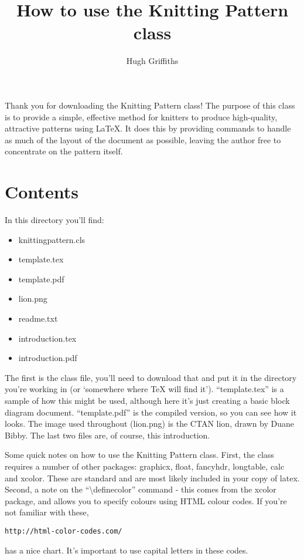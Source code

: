 \documentclass{article}
\title{How to use the Knitting Pattern class}
\author{Hugh Griffiths}
\begin{document}
\maketitle

\pagestyle{fancy}
\fancyhead{}
\fancyfoot{}
\renewcommand{\footrulewidth}{.4pt}
\renewcommand{\headrulewidth}{0pt}
\thispagestyle{fancy}

Thank you for downloading the Knitting Pattern class!  The purpose of this class is to provide a simple, effective method for knitters to produce high-quality, attractive patterns using \LaTeX.  It does this by providing commands to handle as much of the layout of the document as possible, leaving the author free to concentrate on the pattern itself.

\section*{Contents}
In this directory you'll find:
\begin{itemize}
\item
knittingpattern.cls
\item
template.tex
\item
template.pdf
\item
lion.png
\item
readme.txt
\item
introduction.tex
\item
introduction.pdf
\end{itemize}

The first is the class file, you'll need to download that and put it
in the directory you're working in (or `somewhere where TeX will find
it').  ``template.tex'' is a sample of how this might be used,
although here it's just creating a basic block diagram document.
``template.pdf'' is the compiled version, so you can see how it looks.
The image used throughout (lion.png) is the CTAN lion, drawn by Duane
Bibby.  The last two files are, of course, this introduction.

Some quick notes on how to use the Knitting Pattern class.  First, the
class requires a number of other packages: graphicx, float, fancyhdr,
longtable, calc and xcolor.  These are standard and are most likely
included in your copy of latex.  Second, a note on the
``\textbackslash{}definecolor'' command - this comes from the xcolor
package, and allows you to specify colours using HTML colour codes.
If you're not familiar with these,
\begin{verbatim}
http://html-color-codes.com/
\end{verbatim}
has a nice chart.  It's important to use capital letters in these
codes.
\end{document}
